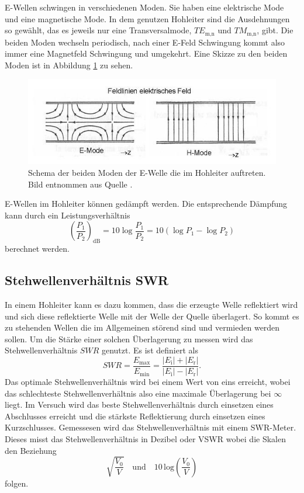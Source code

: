 E-Wellen schwingen in verschiedenen Moden.
Sie haben eine elektrische Mode und eine magnetische Mode.
In dem genutzen Hohleiter sind die Ausdehnungen so gewählt, das es jeweils nur eine Transversalmode, $TE_\text{m,n}$ und $TM_\text{m,n}$, gibt.
Die beiden Moden wechseln periodisch, nach einer E-Feld Schwingung kommt also immer eine Magnetfeld Schwingung und umgekehrt.
Eine Skizze zu den beiden Moden ist in Abbildung \ref{fig:Moden_Hohleiter} zu sehen.

\begin{figure}
    \centering
    \includegraphics[width=\textwidth]{content/data/Moden_Hohleiter.JPG}
    \caption{Schema der beiden Moden der E-Welle die im Hohleiter auftreten. Bild entnommen aus Quelle \cite{wikipedia}.}
    \label{fig:Moden_Hohleiter}
\end{figure}

E-Wellen im Hohleiter können gedämpft werden. Die entsprechende Dämpfung kann durch ein Leistungsverhältnis
\begin{equation}
    \left (\frac{P_1}{P_2} \right )_\text{dB} = 10 \log \frac{P_1}{P_2} = 10 \left ( \log P_1 - \log P_2 \right )
\end{equation}
berechnet werden.
\FloatBarrier

\subsection{Stehwellenverhältnis SWR}
\label{sec:swr}
In einem Hohleiter kann es dazu kommen, dass die erzeugte Welle reflektiert wird und sich diese reflektierte Welle mit der Welle der Quelle überlagert.
So kommt es zu stehenden Wellen die im Allgemeinen störend sind und vermieden werden sollen.
Um die Stärke einer solchen Überlagerung zu messen wird das Stehwellenverhältnis $SWR$ genutzt.
Es ist definiert als 
\begin{equation}
    SWR = \frac{E _\text{max}}{E _\text{min}} = \frac{\left | E _\text{i} \right | + \left | E _\text{r} \right |}{\left | E _\text{i} \right | - \left | E _\text{r} \right |}.
\end{equation}
Das optimale Stehwellenverhältnis wird bei einem Wert von eins erreicht, wobei das schlechteste Stehwellenverhältnis also eine maximale Überlagerung bei $ \infty $ liegt.
Im Versuch wird das beste Stehwellenverhältnis durch einsetzen eines Abschlusses erreicht und die stärkste Reflektierung durch einsetzen eines Kurzschlusses.
Gemessesen wird das Stehwellenverhältnis mit einem SWR-Meter.
Dieses misst das Stehwellenverhältnis in Dezibel oder VSWR wobei die Skalen den Beziehung
\begin{equation*}
    \sqrt{\frac{V_0}{V}}  \quad \text{und}  \quad 10 \, \text{log} \left ( \frac{V_0}{V}\right )  
\end{equation*}
folgen.

